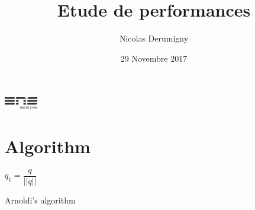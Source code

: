 \documentclass{beamer}
\title[MPNA]{Etude de performances}
\author[N.D.]{Nicolas Derumigny}
\institute[]{ENS Lyon}
\date{29 Novembre 2017}
\begin{document}
\begin{frame}
	\titlepage
	\begin{center}
	\includegraphics[height=0.5cm]{logoens.pdf}

	\end{center}
\end{frame}

\section{Algorithm}
\begin{frame}
\begin{algorithm}[H]
$q_1 = \dfrac{q}{||q||}$ \\
\caption{Arnoldi's algorithm}
\end{algorithm}
\end{frame}
\end{document}
